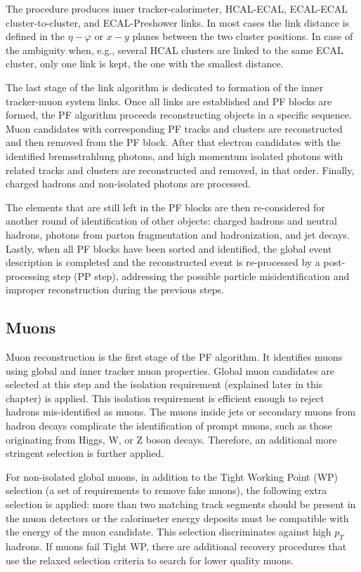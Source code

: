 The procedure produces inner tracker-calorimeter, HCAL-ECAL, ECAL-ECAL  cluster-to-cluster, and ECAL-Preshower links. In most cases the link distance is defined in the $\eta-\varphi$ or $x-y$ planes between the two cluster positions. In case of the ambiguity when, e.g., several HCAL clusters are linked to the same ECAL cluster, only one link is kept, the one with the smallest distance.

The last stage of the link algorithm is dedicated to formation of the inner tracker-muon system links. Once all links are established and PF blocks are formed, the PF algorithm proceeds reconstructing objects in a specific sequence. Muon candidates with corresponding PF tracks and clusters are reconstructed and then removed from the PF block. After that electron candidates with the identified bremsstrahlung photons, and high momentum isolated photons with related tracks and clusters are reconstructed and removed, in that order. Finally, charged hadrons and non-isolated photons are processed.

The elements that are still left in the PF blocks are then re-considered for another round of identification of other objects: charged hadrons and neutral hadrons, photons from parton fragmentation and hadronization, and jet decays. Lastly, when all PF blocks have been sorted and identified, the global event description is completed and the reconstructed event is re-processed by a post-processing step (PP step), addressing the possible particle misidentification and improper reconstruction during the previous steps. 

\subsection{Muons}\label{sec:muons}

Muon reconstruction is the first stage of the PF algorithm. It identifies muons using global and inner tracker muon properties. Global muon candidates are selected at this step and the isolation requirement (explained later in this chapter) is applied. This isolation requirement is efficient enough to reject hadrons mis-identified as muons. The muons inside jets or secondary muons from hadron decays complicate the identification of prompt muons, such as those originating from Higgs, W, or Z boson decays. Therefore, an additional more stringent selection is further applied. 

For non-isolated global muons, in addition to the Tight Working Point (WP) selection (a set of requirements to remove fake muons), the following extra selection is applied: more than two matching track segments should be present in the muon detectors or the calorimeter energy deposits must be compatible with the energy of the muon candidate. This selection discriminates against high $p_T$ hadrons. If muons fail Tight WP, there are additional recovery procedures that use the relaxed selection criteria to search for lower quality muons.

